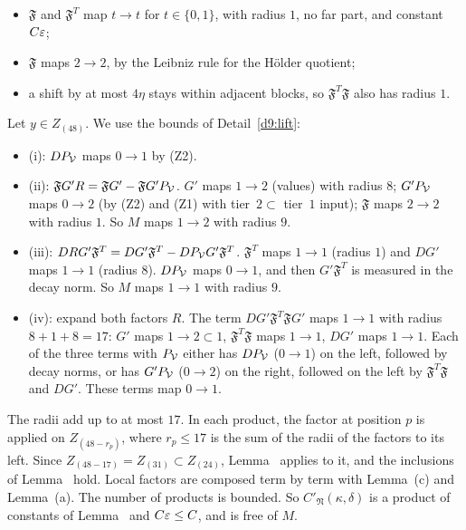 \begin{detail}
\begin{step}
\begin{itemize}
\item $\mathfrak F$ and $\mathfrak F^T$ map $t\to t$ for $t\in\{0,1\}$, with radius $1$, no far part, and constant $C\varepsilon$;
\item $\mathfrak F$ maps $2\to2$, by the Leibniz rule for the H\"older quotient;
\item a shift by at most $4\eta$ stays within adjacent blocks, so $\mathfrak F^T\mathfrak F$ also has radius $1$.
\end{itemize}
\end{step}
\begin{step}
Let $y\in Z_{(48)}$. We use the bounds of Detail~\ref{d9:lift}:
\begin{itemize}
\item (i): $DP_\mathcal V$ maps $0\to1$ by (Z2).
\item (ii): $\mathfrak FG'R=\mathfrak FG'-\mathfrak FG'P_\mathcal V$. $G'$ maps $1\to2$ (values) with radius $8$; $G'P_\mathcal V$ maps $0\to2$ (by (Z2) and (Z1) with tier~$2\subset$ tier~$1$ input); $\mathfrak F$ maps $2\to2$ with radius $1$. So $M$ maps $1\to2$ with radius $9$.
\item (iii): $DRG'\mathfrak F^T=DG'\mathfrak F^T-DP_\mathcal V G'\mathfrak F^T$. $\mathfrak F^T$ maps $1\to1$ (radius $1$) and $DG'$ maps $1\to1$ (radius $8$). $DP_\mathcal V$ maps $0\to1$, and then $G'\mathfrak F^T$ is measured in the decay norm. So $M$ maps $1\to1$ with radius $9$.
\item (iv): expand both factors $R$. The term $DG'\mathfrak F^T\mathfrak FG'$ maps $1\to1$ with radius $8+1+8=17$: $G'$ maps $1\to2\subset1$, $\mathfrak F^T\mathfrak F$ maps $1\to1$, $DG'$ maps $1\to1$. Each of the three terms with $P_\mathcal V$ either has $DP_\mathcal V$ ($0\to1$) on the left, followed by decay norms, or has $G'P_\mathcal V$ ($0\to2$) on the right, followed on the left by $\mathfrak F^T\mathfrak F$ and $DG'$. These terms map $0\to1$.
\end{itemize}
The radii add up to at most $17$. In each product, the factor at position $p$ is applied on $Z_{(48-r_p)}$, where $r_p\le17$ is the sum of the radii of the factors to its left. Since $Z_{(48-17)}=Z_{(31)}\subset Z_{(24)}$, Lemma~ applies to it, and the inclusions of Lemma~ hold. Local factors are composed term by term with Lemma~(c) and Lemma~(a). The number of products is bounded. So $C'_{\mathfrak N}(\kappa,\delta)$ is a product of constants of Lemma~ and $C\varepsilon\le C$, and is free of $M$.

\end{step}
\end{detail}
